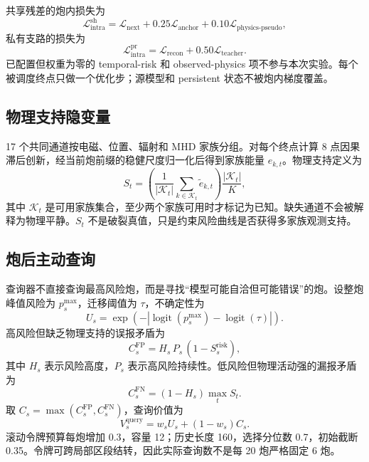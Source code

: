 共享残差的炮内损失为
\begin{equation}
\mathcal L_{\mathrm{intra}}^{\mathrm{sh}}
=\mathcal L_{\mathrm{next}}+0.25\mathcal L_{\mathrm{anchor}}
+0.10\mathcal L_{\mathrm{physics\mbox{-}pseudo}},
\label{eq:intra-shared}
\end{equation}
私有支路的损失为
\begin{equation}
\mathcal L_{\mathrm{intra}}^{\mathrm{pr}}
=\mathcal L_{\mathrm{recon}}+0.50\mathcal L_{\mathrm{teacher}}.
\label{eq:intra-private}
\end{equation}
已配置但权重为零的 temporal-risk 和 observed-physics 项不参与本次实验。每个被调度终点只做一个优化步；源模型和 persistent 状态不被炮内梯度覆盖。

\subsection{物理支持隐变量}

17 个共同通道按电磁、位置、辐射和 MHD 家族分组。对每个终点计算 8 点因果滞后创新，经当前炮前缀的稳健尺度归一化后得到家族能量 $e_{k,t}$。物理支持定义为
\begin{equation}
S_t=\left(\frac{1}{|\mathcal K_t|}\sum_{k\in\mathcal K_t}\widetilde e_{k,t}\right)
\frac{|\mathcal K_t|}{K},
\label{eq:physics-support}
\end{equation}
其中 $\mathcal K_t$ 是可用家族集合，至少两个家族可用时才标记为已知。缺失通道不会被解释为物理平静。$S_t$ 不是破裂真值，只是约束风险曲线是否获得多家族观测支持。

\subsection{炮后主动查询}

查询器不直接查询最高风险炮，而是寻找``模型可能自洽但可能错误''的炮。设整炮峰值风险为 $p_s^{\max}$，迁移阈值为 $\tau$，不确定性为
\begin{equation}
U_s=\exp\!\left(-\left|\operatorname{logit}(p_s^{\max})-\operatorname{logit}(\tau)\right|\right).
\end{equation}
高风险但缺乏物理支持的误报矛盾为
\[
C_s^{\mathrm{FP}}=H_s\,P_s\,(1-S_s^{\mathrm{risk}}),
\]
其中 $H_s$ 表示风险高度，$P_s$ 表示高风险持续性。低风险但物理活动强的漏报矛盾为
\[
C_s^{\mathrm{FN}}=(1-H_s)\max_t S_t.
\]
取 $C_s=\max(C_s^{\mathrm{FP}},C_s^{\mathrm{FN}})$，查询价值为
\begin{equation}
V_s^{\mathrm{query}}=w_sU_s+(1-w_s)C_s.
\label{eq:query}
\end{equation}
滚动令牌预算每炮增加 0.3，容量 12；历史长度 160，选择分位数 0.7，初始截断 0.35。令牌可跨局部区段结转，因此实际查询数不是每 20 炮严格固定 6 炮。

